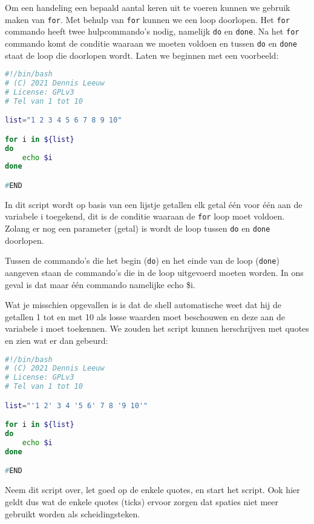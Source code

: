 Om een handeling een bepaald aantal keren uit te voeren kunnen we gebruik maken van \texttt{for}. Met behulp van \texttt{for} kunnen we een loop doorlopen. Het \texttt{for} commando heeft twee hulpcommando's nodig, namelijk \texttt{do} en \texttt{done}. Na het \texttt{for} commando komt de conditie waaraan we moeten voldoen en tussen \texttt{do} en \texttt{done} staat de loop die doorlopen wordt. Laten we beginnen met een voorbeeld:
\begin{lstlisting}[language=bash]
#!/bin/bash
# (C) 2021 Dennis Leeuw
# License: GPLv3
# Tel van 1 tot 10

list="1 2 3 4 5 6 7 8 9 10"

for i in ${list}
do
	echo $i
done

#END
\end{lstlisting}
In dit script wordt op basis van een lijstje getallen elk getal \'e\'en voor \'e\'en aan de variabele i toegekend, dit is de conditie waaraan de \texttt{for} loop moet voldoen. Zolang er nog een parameter (getal) is wordt de loop tussen \texttt{do} en \texttt{done} doorlopen.

Tussen de commando's die het begin (\texttt{do}) en het einde van de loop (\texttt{done}) aangeven staan de commando's die in de loop uitgevoerd moeten worden. In ons geval is dat maar \'e\'en commando namelijke echo \$i.

Wat je misschien opgevallen is is dat de shell automatische weet dat hij de getallen 1 tot en met 10 als losse waarden moet beschouwen en deze aan de variabele i moet toekennen. We zouden het script kunnen herschrijven met quotes en zien wat er dan gebeurd:
\begin{lstlisting}[language=bash]
#!/bin/bash
# (C) 2021 Dennis Leeuw
# License: GPLv3
# Tel van 1 tot 10

list="'1 2' 3 4 '5 6' 7 8 '9 10'"

for i in ${list}
do
	echo $i
done

#END
\end{lstlisting}
Neem dit script over, let goed op de enkele quotes, en start het script. Ook hier geldt dus wat de enkele quotes (ticks) ervoor zorgen dat spaties niet meer gebruikt worden als scheidingsteken.

